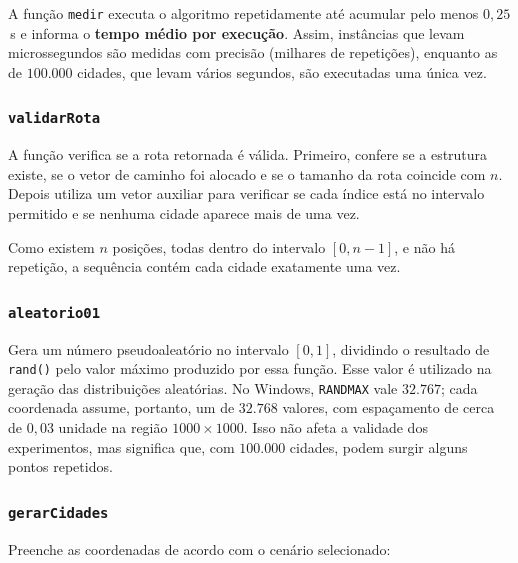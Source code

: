 \documentclass[11pt,a4paper]{article}
\renewcommand{\_}{\underscoreoriginal\allowbreak}
\begin{document}
A função \texttt{medir} executa o algoritmo repetidamente até acumular
pelo menos $0{,}25$\,s e informa o \textbf{tempo médio por execução}.
Assim, instâncias que levam microssegundos são medidas com precisão
(milhares de repetições), enquanto as de $100.000$ cidades, que levam
vários segundos, são executadas uma única vez.

\subsubsection{\texttt{validarRota}}

A função verifica se a rota retornada é válida. Primeiro, confere se a
estrutura existe, se o vetor de caminho foi alocado e se o tamanho da
rota coincide com $n$. Depois utiliza um vetor auxiliar para verificar
se cada índice está no intervalo permitido e se nenhuma cidade aparece
mais de uma vez.

Como existem $n$ posições, todas dentro do intervalo $[0,n-1]$, e não há
repetição, a sequência contém cada cidade exatamente uma vez.

\subsubsection{\texttt{aleatorio01}}

Gera um número pseudoaleatório no intervalo $[0,1]$, dividindo o
resultado de \texttt{rand()} pelo valor máximo produzido por essa
função. Esse valor é utilizado na geração das distribuições aleatórias.
No Windows, \texttt{RAND\_MAX} vale $32.767$; cada coordenada assume,
portanto, um de $32.768$ valores, com espaçamento de cerca de $0{,}03$
unidade na região $1000\times1000$. Isso não afeta a validade dos
experimentos, mas significa que, com $100.000$ cidades, podem surgir
alguns pontos repetidos.

\subsubsection{\texttt{gerarCidades}}

Preenche as coordenadas de acordo com o cenário selecionado:
\end{document}
